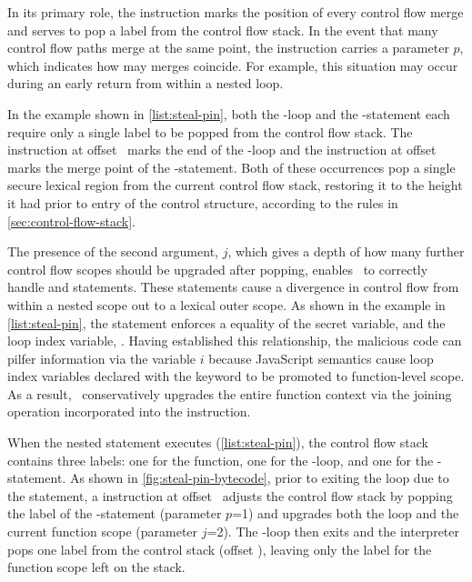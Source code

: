 In its primary role, the \popj instruction marks the position of every control flow merge and serves to pop a label from the control flow stack.
In the event that many control flow paths merge at the same point, the \popj instruction carries a parameter $p$, which indicates how may merges coincide.
For example, this situation may occur during an early return from within a nested loop.

In the example shown in \autoref{list:steal-pin}, both the -loop and the -statement each require only a single label to be popped from the control flow stack.
The \popj instruction at offset~ marks the end of the -loop and the \popj instruction at offset~ marks the merge point of the -statement.
Both of these occurrences pop a single secure lexical region from the current control flow stack, restoring it to the height it had prior to entry of the control structure, according to the rules in \autoref{sec:control-flow-stack}.

The presence of the second argument, $j$, which gives a depth of how many further control flow scopes should be upgraded after popping, enables \FlowCore\ to correctly handle  and  statements.
These statements cause a divergence in control flow from within a nested scope out to a lexical outer scope.
As shown in the example in \autoref{list:steal-pin}, the  statement enforces a equality of the secret variable,  and the loop index variable, .
Having established this relationship, the malicious code can pilfer information via the variable $i$ because JavaScript semantics cause loop index variables declared with the  keyword to be promoted to function-level scope.
As a result, \FlowCore\ conservatively upgrades the entire function context via the joining operation incorporated into the \popj instruction.

When the nested  statement executes (\autoref{list:steal-pin}), the control flow stack contains three labels: one for the function, one for the -loop, and one for the -statement.
As shown in \autoref{fig:steal-pin-bytecode}, prior to exiting the loop due to the  statement, a \popj instruction at offset~ adjusts the control flow stack by popping the label of the -statement (parameter $p$=1) and upgrades both the  loop and the current function scope (parameter $j$=2).
The -loop then exits and the interpreter pops one label from the control stack (offset ), leaving only the label for the function scope left on the stack.

